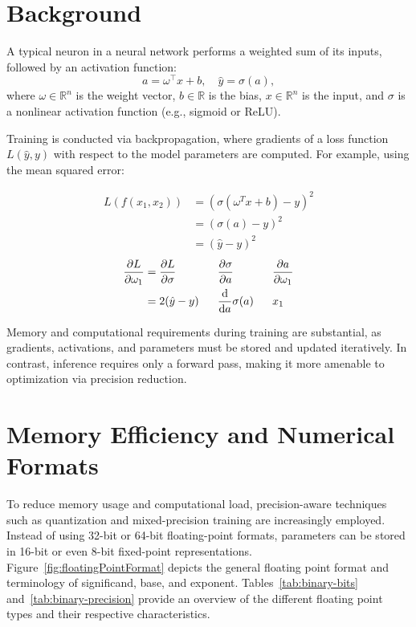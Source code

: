 \documentclass[11pt]{article}
\begin{document}
\section{Background}

A typical neuron in a neural network performs a weighted sum of its inputs,
followed by an activation function:
\[
	a = \omega^\top x + b,\quad \hat{y} = \sigma(a),
\]
where \( \omega \in \mathbb{R}^n \) is the weight vector, \( b \in \mathbb{R}
\) is the bias, \( x \in \mathbb{R}^n \) is the input, and \( \sigma \) is a
nonlinear activation function (e.g., sigmoid or ReLU).

Training is conducted via backpropagation, where gradients of a loss function
\( L(\hat{y}, y) \) with respect to the model parameters are computed. For
example, using the mean squared error:

\begin{align*}
	L(f(x_1, x_2)) & = {(\sigma(\omega^T x + b) - y)}^2 \\
	               & = {(\sigma(a) - y)}^2              \\
	               & = {(\hat y - y)}^2
\end{align*}
\begin{alignat*}{3}
	\pdv{L}{\omega_1} & = \pdv{L}{\sigma} &  & \pdv{\sigma}{a}      &  & \pdv{a}{\omega_1} \\
	                  & = 2(\hat y - y)~~ &  & \odv{}{a}\sigma(a)~~ &  & x_1
\end{alignat*}

Memory and computational requirements during training are substantial, as
gradients, activations, and parameters must be stored and updated iteratively.
In contrast, inference requires only a forward pass, making it more amenable to
optimization via precision reduction.

\section{Memory Efficiency and Numerical Formats}

To reduce memory usage and computational load, precision-aware techniques such
as quantization and mixed-precision training are increasingly employed. Instead
of using 32-bit or 64-bit floating-point formats, parameters can be stored in
16-bit or even 8-bit fixed-point representations.
Figure~\ref{fig:floatingPointFormat} depicts the general floating point format
and terminology of significand, base, and exponent.
Tables~\ref{tab:binary-bits} and~\ref{tab:binary-precision} provide an overview
of the different floating point types and their respective characteristics.
\end{document}

